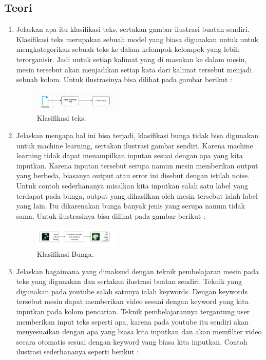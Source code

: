 \subsection{Teori}
\begin{enumerate}

	\item Jelaskan apa itu klasifikasi teks, sertakan gambar ilustrasi buatan sendiri.
	\hfill\break
	Klasifikasi teks merupakan sebuah model yang biasa digunakan untuk untuk mengkategorikan sebuah teks ke dalam kelompok-kelompok yang lebih terorganisir. Jadi untuk setiap kalimat yang di masukan ke dalam mesin, mesin tersebut akan menjadikan setiap kata dari kalimat tersebut menjadi sebuah kolom. Untuk ilustrasinya bisa dilihat pada gambar berikut : 

	\begin{figure}[H]
	\centering
		\includegraphics[width=4cm]{figures/1174071/4/materi/1.PNG}
		\caption{Klasifikasi teks.}
	\end{figure}

	\item Jelaskan mengapa hal ini bisa terjadi, klasifikasi bunga tidak bisa digunakan untuk machine learning, sertakan ilustrasi gambar sendiri.
	\hfill\break
	Karena machine learning tidak dapat menampilkan inputan sesuai dengan apa yang kita inputkan. Karena inputan tersebut serupa namun mesin memberikan output yang berbeda, biasanya output atau error ini disebut dengan istilah noise. Untuk contoh sederhananya misalkan kita inputkan salah satu label yang terdapat pada bunga, output yang dihasilkan oleh mesin tersebut ialah label yang lain. Itu dikarenakan bunga banyak jenis yang serupa namun tidak sama. Untuk ilustrasinya bisa dilihat pada gambar berikut : 

	\begin{figure}[H]
	\centering
		\includegraphics[width=4cm]{figures/1174071/4/materi/2.PNG}
		\caption{Klasifikasi Bunga.}
	\end{figure}
	
	\item Jelaskan bagaimana yang dimaksud dengan teknik pembelajaran mesin pada teks yang digunakan dan sertakan ilustrasi buatan sendiri.
	\hfill\break
	Teknik yang digunakan pada youtube salah satunya ialah keywords. Dengan keywords tersebut mesin dapat memberikan video sesuai dengan keyword yang kita inputkan pada kolom pencarian. Teknik pembelajarannya tergantung user memberikan input teks seperti apa, karena pada youtube itu sendiri akan menyesuaikan dengan apa yang biasa kita inputkan dan akan memfilter video secara otomatis sesuai dengan keyword yang biasa kita inputkan. Contoh ilustrasi sederhananya seperti berikut :


\end{enumerate}
